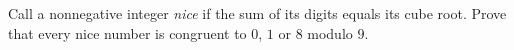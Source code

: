 Call a nonnegative integer \emph{nice} if the sum of its digits equals its cube root. Prove that every nice number is congruent to $0$, $1$ or $8$ modulo $9$.
